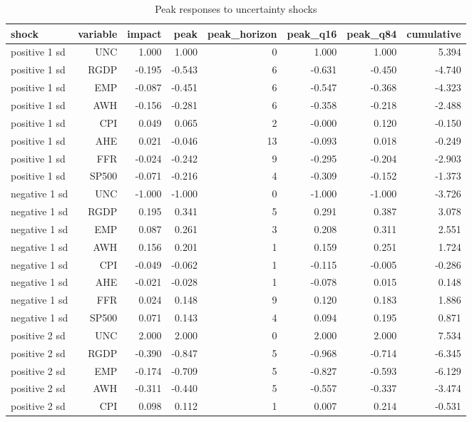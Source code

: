 \begin{table}[htbp]
\centering
\caption{Peak responses to uncertainty shocks}
\label{tab:peaks}
\begin{tabular}{lrrrrrrr}
\toprule
shock & variable & impact & peak & peak\_horizon & peak\_q16 & peak\_q84 & cumulative \\
\midrule
positive 1 sd & UNC & 1.000 & 1.000 & 0 & 1.000 & 1.000 & 5.394 \\
positive 1 sd & RGDP & -0.195 & -0.543 & 6 & -0.631 & -0.450 & -4.740 \\
positive 1 sd & EMP & -0.087 & -0.451 & 6 & -0.547 & -0.368 & -4.323 \\
positive 1 sd & AWH & -0.156 & -0.281 & 6 & -0.358 & -0.218 & -2.488 \\
positive 1 sd & CPI & 0.049 & 0.065 & 2 & -0.000 & 0.120 & -0.150 \\
positive 1 sd & AHE & 0.021 & -0.046 & 13 & -0.093 & 0.018 & -0.249 \\
positive 1 sd & FFR & -0.024 & -0.242 & 9 & -0.295 & -0.204 & -2.903 \\
positive 1 sd & SP500 & -0.071 & -0.216 & 4 & -0.309 & -0.152 & -1.373 \\
negative 1 sd & UNC & -1.000 & -1.000 & 0 & -1.000 & -1.000 & -3.726 \\
negative 1 sd & RGDP & 0.195 & 0.341 & 5 & 0.291 & 0.387 & 3.078 \\
negative 1 sd & EMP & 0.087 & 0.261 & 3 & 0.208 & 0.311 & 2.551 \\
negative 1 sd & AWH & 0.156 & 0.201 & 1 & 0.159 & 0.251 & 1.724 \\
negative 1 sd & CPI & -0.049 & -0.062 & 1 & -0.115 & -0.005 & -0.286 \\
negative 1 sd & AHE & -0.021 & -0.028 & 1 & -0.078 & 0.015 & 0.148 \\
negative 1 sd & FFR & 0.024 & 0.148 & 9 & 0.120 & 0.183 & 1.886 \\
negative 1 sd & SP500 & 0.071 & 0.143 & 4 & 0.094 & 0.195 & 0.871 \\
positive 2 sd & UNC & 2.000 & 2.000 & 0 & 2.000 & 2.000 & 7.534 \\
positive 2 sd & RGDP & -0.390 & -0.847 & 5 & -0.968 & -0.714 & -6.345 \\
positive 2 sd & EMP & -0.174 & -0.709 & 5 & -0.827 & -0.593 & -6.129 \\
positive 2 sd & AWH & -0.311 & -0.440 & 5 & -0.557 & -0.337 & -3.474 \\
positive 2 sd & CPI & 0.098 & 0.112 & 1 & 0.007 & 0.214 & -0.531 \\

\end{tabular}
\end{table}
